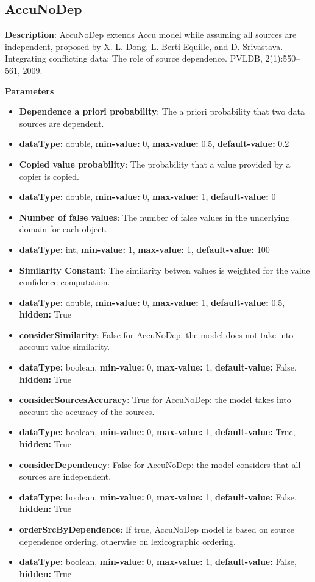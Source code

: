 \documentclass[a4paper,10pt]{scrartcl}
\begin{document}
\subsection{AccuNoDep}
\begin{description}
\item \textbf{Description}: AccuNoDep extends Accu model while assuming all sources are independent, proposed by X. L. Dong, L. Berti-Equille, and D. Srivastava. Integrating conflicting data: The role of source dependence. PVLDB, 2(1):550–561, 2009.
\item \textbf{Parameters}
\begin{itemize}
\item \textbf{Dependence a priori probability}: The a priori probability that two data sources are dependent.
\item[]\textbf{dataType: }double, \textbf{min-value: }0, \textbf{max-value: }0.5, \textbf{default-value: }0.2\item \textbf{Copied value probability}: The probability that a value provided by a copier is copied.
\item[]\textbf{dataType: }double, \textbf{min-value: }0, \textbf{max-value: }1, \textbf{default-value: }0\item \textbf{Number of false values}: The number of false values in the underlying domain for each object.
\item[]\textbf{dataType: }int, \textbf{min-value: }1, \textbf{max-value: }1, \textbf{default-value: }100\item \textbf{Similarity Constant}: The similarity betwen values is weighted for the value confidence computation.
\item[]\textbf{dataType: }double, \textbf{min-value: }0, \textbf{max-value: }1, \textbf{default-value: }0.5, \textbf{hidden: }True
\item \textbf{considerSimilarity}: False for AccuNoDep: the model does not take into account value similarity.
\item[]\textbf{dataType: }boolean, \textbf{min-value: }0, \textbf{max-value: }1, \textbf{default-value: }False, \textbf{hidden: }True
\item \textbf{considerSourcesAccuracy}: True for AccuNoDep: the model takes into account the accuracy of the sources.
\item[]\textbf{dataType: }boolean, \textbf{min-value: }0, \textbf{max-value: }1, \textbf{default-value: }True, \textbf{hidden: }True
\item \textbf{considerDependency}: False for AccuNoDep: the model considers that all sources are independent.
\item[]\textbf{dataType: }boolean, \textbf{min-value: }0, \textbf{max-value: }1, \textbf{default-value: }False, \textbf{hidden: }True
\item \textbf{orderSrcByDependence}: If true, AccuNoDep model is based on source dependence ordering, otherwise on lexicographic ordering.
\item[]\textbf{dataType: }boolean, \textbf{min-value: }0, \textbf{max-value: }1, \textbf{default-value: }False, \textbf{hidden: }True
\end{itemize}
\end{description}
\end{document}
